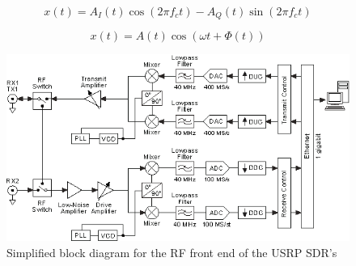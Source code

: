 \begin{equation} \label{eq:complexSampling}
    x\left(t\right) = A_{I}\left(t\right)\cos\left(2\pi f_{c}t\right) - A_{Q}\left(t\right)\sin\left(2\pi f_{c}t\right)
\end{equation}

\begin{equation} \label{eq:realSampling}
    x\left(t\right) = A\left(t\right)\cos\left(\omega t + \Phi \left(t\right)\right)
\end{equation}

\begin{figure}[h]
    \begin{centering}
        \includegraphics[width=13cm,keepaspectratio]{Figures/2920_simplified_system_diagram.png}
        \caption{Simplified block diagram for the RF front end of the USRP SDR's}
    \label{fig:USRPBlock}
    \end{centering}
\end{figure}